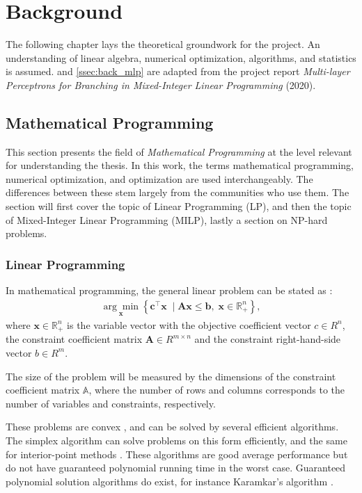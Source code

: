 \chapter{Background}\label{cha:background}

The following chapter lays the theoretical groundwork for the project. An understanding of linear algebra, numerical optimization, algorithms, and statistics is assumed.  and \ref{ssec:back_mlp} are adapted from the project report \textit{Multi-layer Perceptrons for Branching in Mixed-Integer Linear Programming} (2020). 


\section{Mathematical Programming}\label{sec:back_mathprog}

This section presents the field of \textit{Mathematical Programming} at the level relevant for understanding the thesis.
In this work, the terms mathematical programming, numerical optimization, and optimization are used interchangeably. The differences between these stem largely from the communities who use them. The section will first cover the topic of Linear Programming (\gls{LP}), and then the topic of Mixed-Integer Linear Programming (\gls{MILP}), lastly a section on NP-hard problems.  


\subsection{Linear Programming}

In mathematical programming, the general linear problem can be stated as \cite{gasse2019exact}:
\begin{align} \label{eq:lp}
    \underset{\mathbf{x}}{\arg \min }\left\{\mathbf{c}^{\top} \mathbf{x} \; \mid \mathbf{A} \mathbf{x} \leq \mathbf{b},\; \mathbf{x} \in \mathbb{R}_+^{n}\right\},
\end{align}
where $ \mathbf{x} \in \mathbb{R}_+^n$ is the variable vector
with the objective coefficient vector $c \in R^n $, 
the constraint coefficient matrix $\mathbf{A} \in R^{m \times n}$
and the constraint right-hand-side vector $b \in R^m $.

The size of the problem will be measured by the dimensions of the constraint coefficient matrix $ \mathbb{A} $, where the number of rows and columns corresponds to the number of variables and constraints, respectively.

These problems are convex \cite{wolsey2020integer}, and can be solved by several efficient algorithms. The simplex algorithm can solve problems on this form efficiently, and the same for interior-point methods \cite{nocedal2006numerical}. These algorithms are good average performance but do not have guaranteed polynomial running time in the worst case. Guaranteed polynomial solution algorithms do exist, for instance Karamkar's algorithm \cite{karamkar1984new}. 


